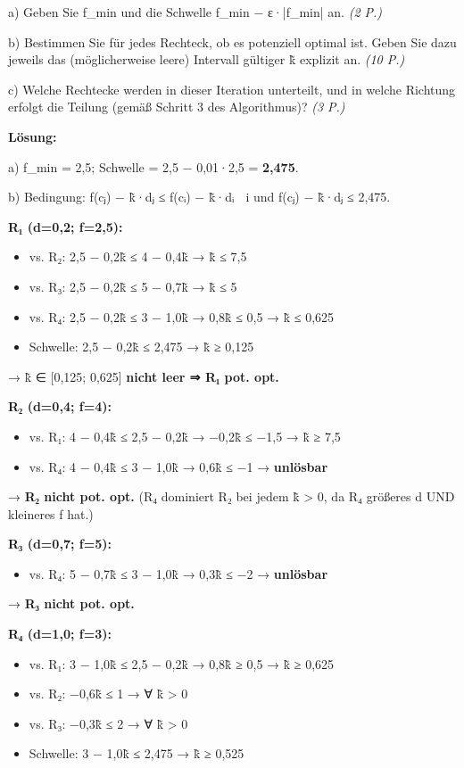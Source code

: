 \documentclass[11pt, a4paper]{article}
\begin{document}
a) Geben Sie f\_min und die Schwelle f\_min − ε·|f\_min| an. \textit{(2 P.)}


b) Bestimmen Sie für jedes Rechteck, ob es potenziell optimal ist. Geben Sie dazu jeweils das (möglicherweise leere) Intervall gültiger k̃ explizit an. \textit{(10 P.)}


c) Welche Rechtecke werden in dieser Iteration unterteilt, und in welche Richtung erfolgt die Teilung (gemäß Schritt 3 des Algorithmus)? \textit{(3 P.)}


\textbf{Lösung:}


a) f\_min = 2,5; Schwelle = 2,5 − 0,01·2,5 = \textbf{2,475}.


b) Bedingung: f(c⃗ⱼ) − k̃·dⱼ ≤ f(c⃗ᵢ) − k̃·dᵢ ∀ i  und  f(c⃗ⱼ) − k̃·dⱼ ≤ 2,475.


\textbf{R₁ (d=0,2; f=2,5):}

\begin{itemize}
  \item vs. R₂: 2,5 − 0,2k̃ ≤ 4 − 0,4k̃ → k̃ ≤ 7,5
  \item vs. R₃: 2,5 − 0,2k̃ ≤ 5 − 0,7k̃ → k̃ ≤ 5
  \item vs. R₄: 2,5 − 0,2k̃ ≤ 3 − 1,0k̃ → 0,8k̃ ≤ 0,5 → k̃ ≤ 0,625
  \item Schwelle: 2,5 − 0,2k̃ ≤ 2,475 → k̃ ≥ 0,125
\end{itemize}

→ k̃ ∈ [0,125; 0,625] \textbf{nicht leer ⇒ R₁ pot. opt.}


\textbf{R₂ (d=0,4; f=4):}

\begin{itemize}
  \item vs. R₁: 4 − 0,4k̃ ≤ 2,5 − 0,2k̃ → −0,2k̃ ≤ −1,5 → k̃ ≥ 7,5
  \item vs. R₄: 4 − 0,4k̃ ≤ 3 − 1,0k̃ → 0,6k̃ ≤ −1 → \textbf{unlösbar}
\end{itemize}

→ \textbf{R₂ nicht pot. opt.} (R₄ dominiert R₂ bei jedem k̃ > 0, da R₄ größeres d UND kleineres f hat.)


\textbf{R₃ (d=0,7; f=5):}

\begin{itemize}
  \item vs. R₄: 5 − 0,7k̃ ≤ 3 − 1,0k̃ → 0,3k̃ ≤ −2 → \textbf{unlösbar}
\end{itemize}

→ \textbf{R₃ nicht pot. opt.}


\textbf{R₄ (d=1,0; f=3):}

\begin{itemize}
  \item vs. R₁: 3 − 1,0k̃ ≤ 2,5 − 0,2k̃ → 0,8k̃ ≥ 0,5 → k̃ ≥ 0,625
  \item vs. R₂: −0,6k̃ ≤ 1 → ∀ k̃ > 0
  \item vs. R₃: −0,3k̃ ≤ 2 → ∀ k̃ > 0
  \item Schwelle: 3 − 1,0k̃ ≤ 2,475 → k̃ ≥ 0,525
\end{itemize}
\end{document}
